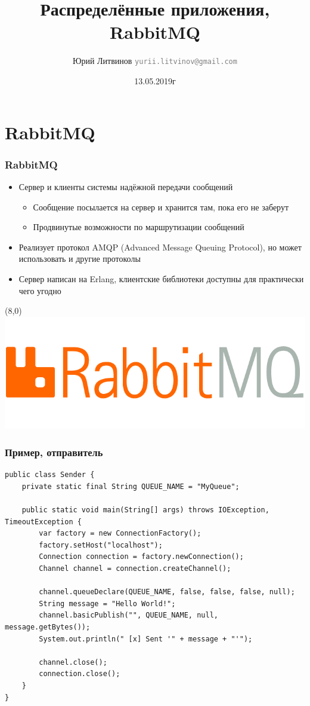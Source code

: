 \documentclass[xetex,mathserif,serif]{beamer}
\title{Распределённые приложения, RabbitMQ}
\author[Юрий Литвинов]{Юрий Литвинов \newline \textcolor{gray}{\small\texttt{yurii.litvinov@gmail.com}}}
\date{13.05.2019г}
\begin{document}
	\frame{\titlepage}

	\section{RabbitMQ}

	\begin{frame}
		\frametitle{RabbitMQ}
		\begin{itemize}
			\item Сервер и клиенты системы надёжной передачи сообщений
			\begin{itemize}
				\item Сообщение посылается на сервер и хранится там, пока его не заберут
				\item Продвинутые возможности по маршрутизации сообщений
			\end{itemize}
			\item Реализует протокол AMQP (Advanced Message Queuing Protocol), но может использовать и другие протоколы
			\item Сервер написан на Erlang, клиентские библиотеки доступны для практически чего угодно
		\end{itemize}
		\begin{textblock}{3}(8,0)
			\includegraphics[width=\textwidth]{rabbitmqLogo.png}
		\end{textblock}
	\end{frame}

	\begin{frame}[fragile]
		\frametitle{Пример, отправитель}
		\begin{ssmall}
			\begin{verbatim}
public class Sender {
    private static final String QUEUE_NAME = "MyQueue";

    public static void main(String[] args) throws IOException, TimeoutException {
        var factory = new ConnectionFactory();
        factory.setHost("localhost");
        Connection connection = factory.newConnection();
        Channel channel = connection.createChannel();

        channel.queueDeclare(QUEUE_NAME, false, false, false, null);
        String message = "Hello World!";
        channel.basicPublish("", QUEUE_NAME, null, message.getBytes());
        System.out.println(" [x] Sent '" + message + "'");

        channel.close();
        connection.close();
    }
}
			\end{verbatim}
		\end{ssmall}
	\end{frame}
\end{document}
